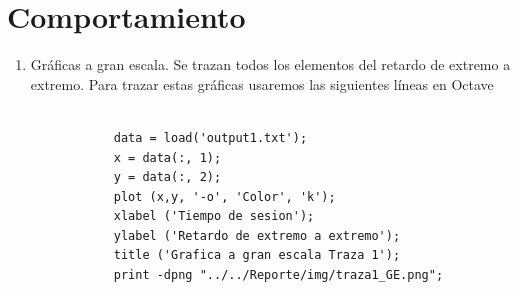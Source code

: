 \section*{Comportamiento}

\begin{enumerate}
  \item Gr\'aficas a gran escala. Se trazan todos los elementos del retardo de extremo a extremo. Para trazar estas gr\'aficas
  usaremos las siguientes l\'ineas en Octave
  \begin{figure}[H]
    \centering
    \begin{lstlisting}[frame=single, breaklines=true, basicstyle=\footnotesize\ttfamily, breakatwhitespace=false, 
      columns=flexible, tabsize=2, showstringspaces=false]

      data = load('output1.txt');
      x = data(:, 1);
      y = data(:, 2);
      plot (x,y, '-o', 'Color', 'k');
      xlabel ('Tiempo de sesion');
      ylabel ('Retardo de extremo a extremo');
      title ('Grafica a gran escala Traza 1');
      print -dpng "../../Reporte/img/traza1_GE.png";

    \end{lstlisting}
  \end{figure}


\end{enumerate}
